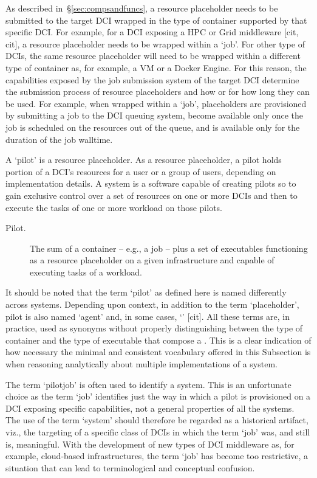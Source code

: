 \documentclass{sig-alternate}
\begin{document}
As described in~\S\ref{sec:compsandfuncs}, a resource placeholder needs to be
submitted to the target DCI wrapped in the type of container supported
by that specific DCI. For example, for a DCI exposing a HPC or Grid
middleware [cit, cit], a resource placeholder needs to be wrapped within
a `job'. For other type of DCIs, the same resource placeholder will need
to be wrapped within a different type of container as, for example, a VM
or a Docker Engine. For this reason, the capabilities exposed by the job
submission system of the target DCI determine the submission process of
resource placeholders and how or for how long they can be used. For
example, when wrapped within a `job', placeholders are provisioned by
submitting a job to the DCI queuing system, become available only once
the job is scheduled on the resources out of the queue, and is
available only for the duration of the job walltime.

A `pilot' is a resource placeholder. As a resource placeholder, a pilot
holds portion of a DCI's resources for a user or a group of users,
depending on implementation details. A \pilot system is a software
capable of creating pilots so to gain exclusive control over a set of
resources on one or more DCIs and then to execute the tasks of
one or more workload on those pilots.

\begin{description}

\item[Pilot.] The sum of a container -- e.g., a job -- plus a set of
executables functioning as a resource placeholder on a given
infrastructure and capable of executing tasks of a workload.

\end{description}

It should be noted that the term `pilot' as defined here is named
differently across \pilot systems. Depending upon context, in addition
to the term `placeholder', pilot is also named `agent' and, in some
cases, `\pilotjob' [cit]. All these terms are, in practice, used as
synonyms without properly distinguishing between the type of container
and the type of executable that compose a \pilot. This is a clear
indication of how necessary the minimal and consistent vocabulary
offered in this Subsection is when reasoning analytically about multiple
implementations of a \pilotjob system.

The term `pilotjob' is often used to identify a \pilot system. This is
an unfortunate choice as the term `job' identifies just the way in which
a pilot is provisioned on a DCI exposing specific capabilities, not a
general properties of all the \pilot systems. The use of the term
`\pilotjob system' should therefore be regarded as a historical
artifact, viz., the targeting of a specific class of DCIs in which
the term `job' was, and still is, meaningful. With the development of
new types of DCI middleware as, for example, cloud-based infrastructures,
the term `job' has become too restrictive, a situation that can lead to
terminological and conceptual confusion.
\end{document}
